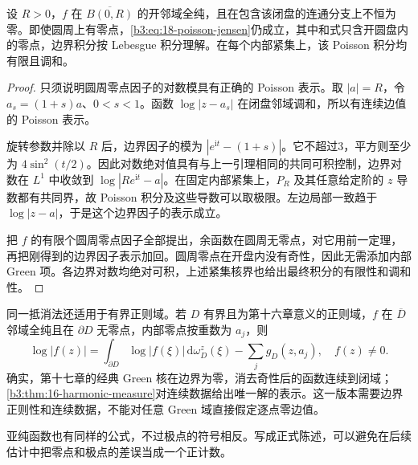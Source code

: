 \begin{proposition}[圆周零点的处理]\label{b3:prop:18-boundary-poisson-jensen}
设 \(R>0\)，\(f\) 在 \(\overline{B(0,R)}\) 的开邻域全纯，且在包含该闭盘的连通分支上不恒为零。即使圆周上有零点，\eqref{b3:eq:18-poisson-jensen}仍成立，其中和式只含开圆盘内的零点，边界积分按 Lebesgue 积分理解。在每个内部紧集上，该 Poisson 积分均有限且调和。
\end{proposition}
\begin{proof}
只须说明圆周零点因子的对数模具有正确的 Poisson 表示。取 \(|a|=R\)，令 \(a_s=(1+s)a\)、\(0<s<1\)。函数 \(\log|z-a_s|\) 在闭盘邻域调和，所以有连续边值的 Poisson 表示。

旋转参数并除以 \(R\) 后，边界因子的模为 \(|e^{\mathrm it}-(1+s)|\)。它不超过3，平方则至少为 \(4\sin^2(t/2)\)。因此对数绝对值具有与上一引理相同的共同可积控制，边界对数在 \(L^1\) 中收敛到 \(\log|Re^{\mathrm it}-a|\)。在固定内部紧集上，\(P_R\) 及其任意给定阶的 \(z\) 导数都有共同界，故 Poisson 积分及这些导数可以取极限。左边局部一致趋于 \(\log|z-a|\)，于是这个边界因子的表示成立。

把 \(f\) 的有限个圆周零点因子全部提出，余函数在圆周无零点，对它用前一定理，再把刚得到的边界因子表示加回。圆周零点在开盘内没有奇性，因此无需添加内部 Green 项。各边界对数均绝对可积，上述紧集核界也给出最终积分的有限性和调和性。
\end{proof}

同一抵消法还适用于有界正则域。若 \(D\) 有界且为第十六章意义的正则域，\(f\) 在 \(\overline D\) 邻域全纯且在 \(\partial D\) 无零点，内部零点按重数为 \(a_j\)，则
\[
 \log|f(z)|
 =\int_{\partial D}\log|f(\xi)|\,\mathrm d\omega_D^z(\xi)
    -\sum_jg_D(z,a_j),\quad f(z)\ne0.
\]
确实，第十七章的经典 Green 核在边界为零，消去奇性后的函数连续到闭域；\cref{b3:thm:16-harmonic-measure}对连续数据给出唯一解的表示。这一版本需要边界正则性和连续数据，不能对任意 Green 域直接假定逐点零边值。

\ProseParagraphBreak
亚纯函数也有同样的公式，不过极点的符号相反。写成正式陈述，可以避免在后续估计中把零点和极点的差误当成一个正计数。

